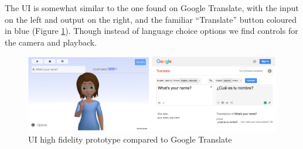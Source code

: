 \documentclass[12pt]{ociamthesis}  %
\begin{document}
The UI is somewhat similar to the one found on Google Translate, with the input on the left and output on the right, and the familiar ``Translate'' button coloured in blue (Figure \ref{fig:hifi}). Though instead of language choice options we find controls for the camera and playback.

\begin{figure}[H]
	\centering
    \includegraphics[scale=0.32]{chapter3/compare}
    \caption{UI high fidelity prototype compared to Google Translate}
    \label{fig:hifi}
\end{figure}
\end{document}
